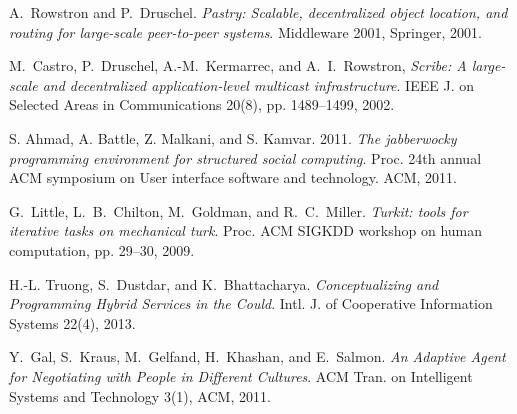 \documentclass{llncs}
\begin{document}
\begin{thebibliography}{1}
A.~Rowstron and P.~Druschel. \emph{Pastry: Scalable, decentralized object location, and routing for large-scale peer-to-peer systems}. Middleware 2001, Springer, 2001.

M.~Castro, P.~Druschel, A.-M.~Kermarrec, and A.~I.~Rowstron, \emph{Scribe: A large-scale and decentralized application-level multicast infrastructure}. IEEE J. on Selected Areas in Communications 20(8), pp. 1489--1499, 2002.

S. Ahmad, A. Battle, Z. Malkani, and S. Kamvar. 2011. \emph{The jabberwocky programming environment for structured social computing}. Proc. 24th annual ACM symposium on User interface software and technology. ACM, 2011.

G.~Little, L.~B.~Chilton, M.~Goldman, and R.~C.~Miller. \emph{Turkit: tools for iterative tasks on mechanical turk}. Proc. ACM SIGKDD workshop on human computation, pp. 29--30, 2009.

 H.-L. Truong, S.~Dustdar, and K.~Bhattacharya. \emph{Conceptualizing and Programming Hybrid Services in the Could}. Intl. J. of Cooperative Information Systems 22(4), 2013. 

Y.~Gal, S.~Kraus, M.~Gelfand, H.~Khashan, and E.~Salmon. \emph{An Adaptive Agent for Negotiating with People in Different Cultures}. ACM Tran. on Intelligent Systems and Technology 3(1), ACM, 2011. 

\end{thebibliography}
\end{document}
